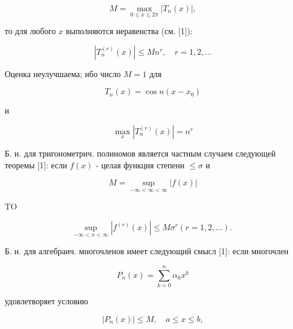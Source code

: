 \documentclass[10pt]{article}
\begin{document}
\[

M=\max _{0 \leqslant x \leqslant 2 \pi}\left|T_{n}(x)\right|,

\]



то для любого $x$ выполняются неравенства (см. [1]):



\[

\left|T_{n}^{(r)}(x)\right| \leqslant M n^{r}, \quad r=1,2, \ldots

\]



Оценка неулучшаема; ибо число $M=1$ для



\[

T_{n}(x)=\cos n\left(x-x_{0}\right)

\]



и



\[

\max _{x}\left|T_{n}^{(r)}(x)\right|=n^{r}

\]



Б. н. для тригонометрич. полиномов является частным случаем следующей теоремы [1]: если $f(x)$ - целая функция степени $\leqslant \sigma$ и



\[

M=\sup _{-\infty<\infty<\infty}|f(x)|

\]



TO



\[

\sup _{-\infty<x<\infty}\left|f^{(r)}(x)\right| \leqslant M \sigma^{r}(r=1,2, \ldots) \text {. }

\]



Б. н. для алгебраич. многочленов имеет следующий смысл [1]: если многочлен



\[

P_{n}(x)=\sum_{k=0}^{n} \alpha_{k} x^{k}

\]



удовлетворяет условию



\[

\left|P_{n}(x)\right| \leqslant M, \quad a \leqslant x \leqslant b,

\]
\end{document}
